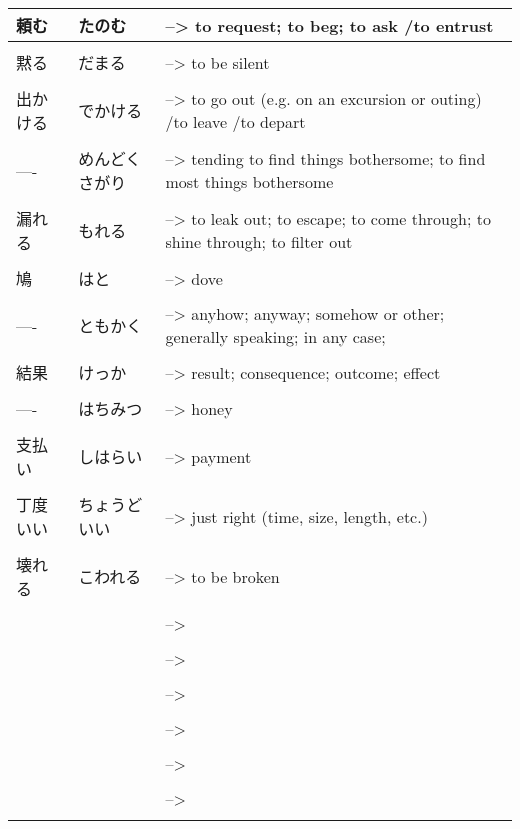 \documentclass{article}
\begin{document}
\begin{tabular}{ l | l p{14cm}  }
頼む & たのむ &--> to request; to beg; to ask /to entrust \\ \hline\\[-1em]
黙る & だまる &--> to be silent \\ \hline\\[-1em]
出かける & でかける &--> to go out (e.g. on an excursion or outing) /to leave /to depart \\ \hline\\[-1em]
---- & めんどくさがり &--> tending to find things bothersome; to find most things bothersome \\ \hline\\[-1em]
漏れる & もれる &--> to leak out; to escape; to come through; to shine through; to filter out \\ \hline\\[-1em]
鳩 & はと &--> dove \\ \hline\\[-1em]
---- & ともかく &--> anyhow; anyway; somehow or other; generally speaking; in any case; \\ \hline\\[-1em]
結果 & けっか &--> result; consequence; outcome; effect \\ \hline\\[-1em]
---- & はちみつ &--> honey \\ \hline\\[-1em]
支払い & しはらい &--> payment \\ \hline\\[-1em]
丁度いい & ちょうどいい  &--> just right (time, size, length, etc.) \\ \hline\\[-1em]
壊れる & こわれる &--> to be broken \\ \hline\\[-1em]
 & &--> \\ \hline\\[-1em]
 & &--> \\ \hline\\[-1em]
 & &--> \\ \hline\\[-1em]
 & &--> \\ \hline\\[-1em]
 & &--> \\ \hline\\[-1em]
 & &--> \\ \hline\\[-1em]
 \end{tabular} \\
\end{document}
